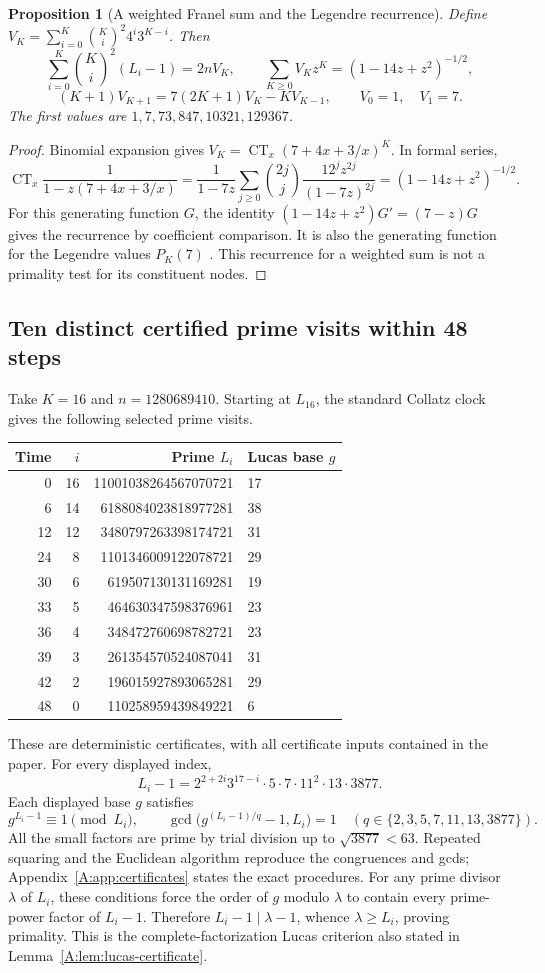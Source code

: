 \documentclass[11pt,a4paper]{article}
\newtheorem{proposition}[theorem]{Proposition}
\theoremstyle{definition}
\theoremstyle{remark}
\numberwithin{equation}{section}
\DeclareMathOperator{\CT}{CT}
\begin{document}
\begin{proposition}[A weighted Franel sum and the Legendre recurrence]
Define $V_K=\sum_{i=0}^K\binom Ki^2 4^i3^{K-i}$. Then
\[
 \sum_{i=0}^K\binom Ki^2(L_i-1)=2nV_K,\qquad
 \sum_{K\ge0}V_Kz^K=(1-14z+z^2)^{-1/2},
\]
\[
 (K+1)V_{K+1}=7(2K+1)V_K-KV_{K-1},\qquad V_0=1,\quad V_1=7.
\]
The first values are $1,7,73,847,10321,129367$.
\end{proposition}
\begin{proof}
Binomial expansion gives $V_K=\CT_x(7+4x+3/x)^K$. In formal series,
\[
 \CT_x\frac1{1-z(7+4x+3/x)}
 =\frac1{1-7z}\sum_{j\ge0}\binom{2j}{j}
 \frac{12^jz^{2j}}{(1-7z)^{2j}}
 =(1-14z+z^2)^{-1/2}.
\]
For this generating function $G$, the identity
$(1-14z+z^2)G'=(7-z)G$ gives the recurrence by coefficient comparison.
It is also the generating function for the Legendre values $P_K(7)$
\cite{R011}. This recurrence for a weighted sum is not a primality test
for its constituent nodes.
\end{proof}

\subsection{Ten distinct certified prime visits within 48 steps}
Take $K=16$ and $n=1280689410$. Starting at $L_{16}$, the standard
Collatz clock gives the following selected prime visits.
\begin{center}\small
\begin{tabular}{rrrl}\toprule
Time & $i$ & Prime $L_i$ & Lucas base $g$\\\midrule
0&16&11001038264567070721&17\\
6&14&6188084023818977281&38\\
12&12&3480797263398174721&31\\
24&8&1101346009122078721&29\\
30&6&619507130131169281&19\\
33&5&464630347598376961&23\\
36&4&348472760698782721&23\\
39&3&261354570524087041&31\\
42&2&196015927893065281&29\\
48&0&110258959439849221&6\\\bottomrule
\end{tabular}
\end{center}
These are deterministic certificates, with all certificate inputs
contained in the paper. For every displayed index,
\[
 L_i-1=2^{2+2i}3^{17-i}\cdot5\cdot7\cdot11^2\cdot13\cdot3877.
\]
Each displayed base $g$ satisfies
\[
 g^{L_i-1}\equiv1\pmod{L_i},\qquad
 \gcd\bigl(g^{(L_i-1)/q}-1,L_i\bigr)=1
 \quad(q\in\{2,3,5,7,11,13,3877\}).
\]
All the small factors are prime by trial division up to $\sqrt{3877}<63$.
Repeated squaring and the Euclidean algorithm reproduce the congruences
and gcds; Appendix~\ref{A:app:certificates} states the exact procedures.
For any prime divisor $\lambda$ of $L_i$, these conditions force the
order of $g$ modulo $\lambda$ to contain every prime-power factor of
$L_i-1$. Therefore $L_i-1\mid\lambda-1$, whence $\lambda\ge L_i$,
proving primality. This is the complete-factorization Lucas criterion
also stated in Lemma~\ref{A:lem:lucas-certificate}.
\end{document}
